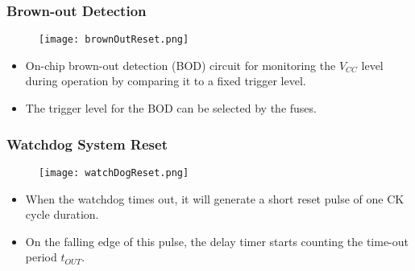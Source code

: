 \documentclass{article}
\begin{document}
\subsubsection{Brown-out Detection}
\begin{figure}[H]
    \begin{center}
        \texttt{[image: brownOutReset.png]}
    \end{center}
\end{figure}
\begin{itemize}
    \item On-chip brown-out detection (BOD) circuit for monitoring the $V_{CC}$ level during operation by comparing it to a fixed trigger level.
    \item The trigger level for the BOD can be selected by the  fuses.
\end{itemize}

\subsubsection{Watchdog System Reset}
\begin{figure}[H]
    \begin{center}
        \texttt{[image: watchDogReset.png]}
    \end{center}
\end{figure}
\begin{itemize}
    \item When the watchdog times out, it will generate a short reset pulse of one CK cycle duration.
    \item On the falling edge of this pulse,
    the delay timer starts counting the time-out period $t_{OUT}$.
\end{itemize}
\end{document}
